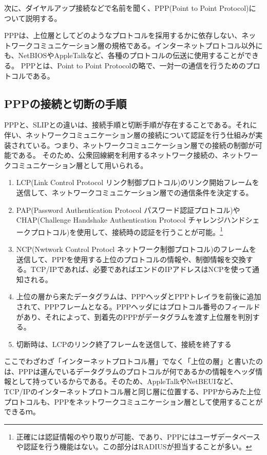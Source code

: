次に、ダイヤルアップ接続などで名前を聞く、PPP(Point to Point Protocol)について説明する。

PPPは、上位層としてどのようなプロトコルを採用するかに依存しない、ネットワークコミュニケーション層の規格である。インターネットプロトコル以外にも、NetBIOSやAppleTalkなど、各種のプロトコルの伝送に使用することができる。
PPPとは、Point to Point Protocolの略で、一対一の通信を行うためのプロトコルである。

\subsection{PPPの接続と切断の手順}
PPPと、SLIPとの違いは、接続手順と切断手順が存在することである。それに伴い、ネットワークコミュニケーション層の接続について認証を行う仕組みが実装されている。つまり、ネットワークコミュニケーション層での接続の制御が可能である。
そのため、公衆回線網を利用するネットワーク接続の、ネットワークコミュニケーション層として用いられる。

\begin{enumerate}
\item LCP(Link Control Protocol リンク制御プロトコル)のリンク開始フレームを送信して、ネットワークコミュニケーション層での通信条件を決定する。
\item PAP(Password Authentication Protocol パスワード認証プロトコル)やCHAP(Challenge Handshake Authentication Protocol チャレンジハンドシェークプロトコル)を使用して、接続時の認証を行うことが可能。\footnote{正確には認証情報のやり取りが可能、であり、PPPにはユーザデータベースや認証を行う機能はない。この部分はRADIUSが担当することが多い。}
\item NCP(Nwtwork Control Protocl ネットワーク制御プロトコル)のフレームを送信して、PPPを使用する上位のプロトコルの情報や、制御情報を交換する。TCP/IPであれば、必要であればエンドのIPアドレスはNCPを使って通知される。
\item 上位の層から来たデータグラムは、PPPヘッダとPPPトレイラを前後に追加されて、PPPフレームとなる。PPPヘッダにはプロトコル番号のフィールドがあり、それによって、到着先のPPPがデータグラムを渡す上位層を判別する。
\item 切断時は、LCPのリンク終了フレームを送信して、接続を終了する
\end{enumerate}

ここでわざわざ「インターネットプロトコル層」でなく「上位の層」と書いたのは、PPPは運んでいるデータグラムのプロトコルが何であるかの情報をヘッダ情報として持っているからである。そのため、AppleTalkやNetBEUIなど、TCP/IPのインターネットプロトコル層と同じ層に位置する、PPPからみた上位プロトコルも、PPPをネットワークコミュニケーション層として使用することができるｍ。

